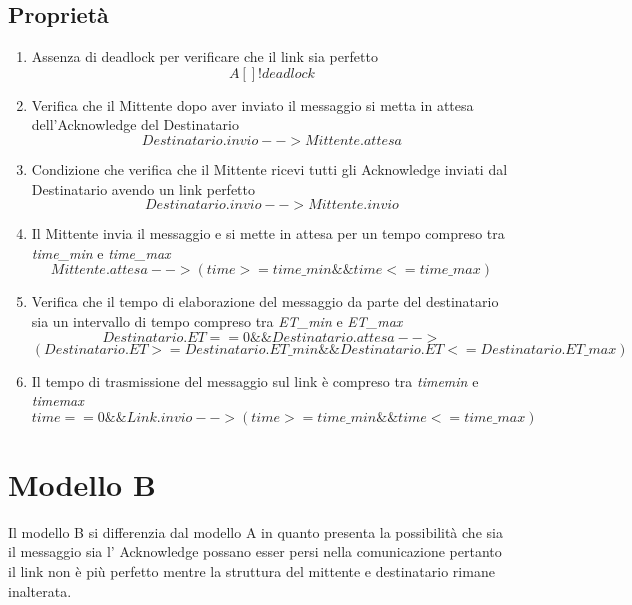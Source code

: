 \documentclass{article}
\begin{document}
\subsection{Proprietà}
\begin{enumerate}
\item Assenza di deadlock per verificare che il link sia perfetto
\begin{equation}
    A[ ] !deadlock 
\end{equation}
\item  Verifica che il Mittente dopo aver inviato il messaggio si metta in attesa dell'Acknowledge del Destinatario
\begin{equation}
Destinatario.invio --> Mittente.attesa 
\end{equation}
\item  Condizione che verifica che il Mittente ricevi tutti gli Acknowledge inviati dal Destinatario avendo un link perfetto 
\begin{equation}
Destinatario.invio --> Mittente.invio 
\end{equation}
\item Il Mittente invia il messaggio e si mette in attesa per un tempo compreso tra \textit{time\_min} e \textit{time\_max}
\begin{equation}
Mittente.attesa --> (time >= time\_min  \&\& time <= time\_max)
\end{equation}
\item Verifica che il tempo di elaborazione del messaggio da parte del destinatario sia un intervallo di tempo compreso tra \textit{ET\_min} e \textit{ET\_max}
\begin{equation}
    Destinatario.ET == 0 \&\& Destinatario.attesa --> 
    \end{equation}
    \begin{equation}
        (Destinatario.ET >= 
    Destinatario.ET\_min \&\& Destinatario.ET <= Destinatario.ET\_max)
 \end{equation}
 \item Il tempo di trasmissione del messaggio sul link è compreso tra \textit{timemin} e \textit{timemax}
\begin{equation}
    time == 0 \&\& Link.invio --> (time >= time\_min \&\& time <= time\_max)
\end{equation}
\end{enumerate}
\clearpage
\section{Modello B}
Il modello B si differenzia dal modello A in quanto presenta la possibilità che sia il messaggio sia l' Acknowledge possano esser persi nella comunicazione pertanto il link non è più perfetto mentre la struttura del mittente e destinatario rimane inalterata.
\end{document}

